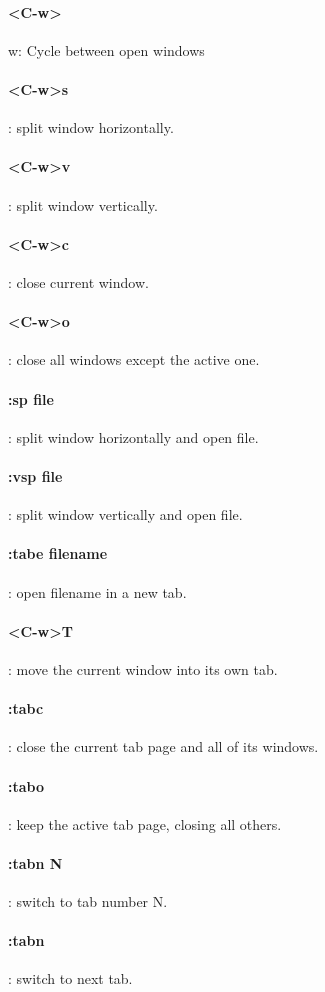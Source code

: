 \documentclass[10pt,letterpaper]{book}
\begin{document}
\paragraph{<C-w>}w: Cycle between open windows
\paragraph{<C-w>s}: split window horizontally.
\paragraph{<C-w>v}: split window vertically.
\paragraph{<C-w>c}: close current window.
\paragraph{<C-w>o}: close all windows except the active one.
\paragraph{:sp {file}}: split window horizontally and open {file}.
\paragraph{:vsp {file}}: split window vertically and open {file}.
\paragraph{:tabe {filename}}: open {filename} in a new tab.
\paragraph{<C-w>T}: move the current window into its own tab.
\paragraph{:tabc}: close the current tab page and all of its windows.
\paragraph{:tabo}: keep the active tab page, closing all others.
\paragraph{:tabn N}: switch to tab number N.
\paragraph{:tabn}: switch to next tab.
\end{document}
